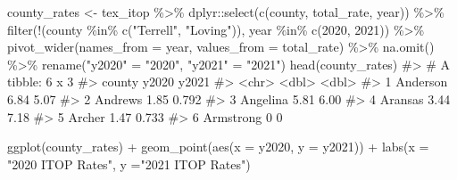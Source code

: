 \documentclass[
  letterpaper,
]{latex/krantz}
\makeatletter
\newenvironment{Shaded}{\begin{snugshade}}{\end{snugshade}}
\newcommand{\AttributeTok}[1]{\textcolor[rgb]{0.40,0.45,0.13}{#1}}
\newcommand{\CommentTok}[1]{\textcolor[rgb]{0.37,0.37,0.37}{#1}}
\newcommand{\DecValTok}[1]{\textcolor[rgb]{0.68,0.00,0.00}{#1}}
\newcommand{\FunctionTok}[1]{\textcolor[rgb]{0.28,0.35,0.67}{#1}}
\newcommand{\NormalTok}[1]{\textcolor[rgb]{0.00,0.23,0.31}{#1}}
\newcommand{\OtherTok}[1]{\textcolor[rgb]{0.00,0.23,0.31}{#1}}
\newcommand{\SpecialCharTok}[1]{\textcolor[rgb]{0.37,0.37,0.37}{#1}}
\newcommand{\StringTok}[1]{\textcolor[rgb]{0.13,0.47,0.30}{#1}}
\newenvironment{kframe}{%
\medskip{}
\setlength{\fboxsep}{.8em}
 \def\at@end@of@kframe{}%
 \ifinner\ifhmode%
  \def\at@end@of@kframe{\end{minipage}}%
  \begin{minipage}{\columnwidth}%
 \fi\fi%
 \def\FrameCommand##1{\hskip\@totalleftmargin \hskip-\fboxsep
 \colorbox{shadecolor}{##1}\hskip-\fboxsep
     \hskip-\linewidth \hskip-\@totalleftmargin \hskip\columnwidth}%
 \MakeFramed {\advance\hsize-\width
   \@totalleftmargin\z@ \linewidth\hsize
   \@setminipage}}%
 {\par\unskip\endMakeFramed%
 \at@end@of@kframe}
\renewenvironment{Shaded}{\begin{kframe}}{\end{kframe}}
\makeatother
\begin{document}
\begin{Shaded}
\begin{Highlighting}[]
\NormalTok{county\_rates }\OtherTok{\textless{}{-}}\NormalTok{ tex\_itop }\SpecialCharTok{\%\textgreater{}\%}
\NormalTok{  dplyr}\SpecialCharTok{::}\FunctionTok{select}\NormalTok{(}\FunctionTok{c}\NormalTok{(county, total\_rate, year)) }\SpecialCharTok{\%\textgreater{}\%}
  \FunctionTok{filter}\NormalTok{(}\SpecialCharTok{!}\NormalTok{(county }\SpecialCharTok{\%in\%} \FunctionTok{c}\NormalTok{(}\StringTok{"Terrell"}\NormalTok{, }\StringTok{"Loving"}\NormalTok{)), }
\NormalTok{         year }\SpecialCharTok{\%in\%} \FunctionTok{c}\NormalTok{(}\DecValTok{2020}\NormalTok{, }\DecValTok{2021}\NormalTok{)) }\SpecialCharTok{\%\textgreater{}\%}
  \FunctionTok{pivot\_wider}\NormalTok{(}\AttributeTok{names\_from =}\NormalTok{ year, }\AttributeTok{values\_from =}\NormalTok{ total\_rate) }\SpecialCharTok{\%\textgreater{}\%}
  \FunctionTok{na.omit}\NormalTok{() }\SpecialCharTok{\%\textgreater{}\%}
  \FunctionTok{rename}\NormalTok{(}\StringTok{"y2020"} \OtherTok{=} \StringTok{"2020"}\NormalTok{, }\StringTok{"y2021"} \OtherTok{=} \StringTok{"2021"}\NormalTok{)}
\FunctionTok{head}\NormalTok{(county\_rates)}
\CommentTok{\#\textgreater{} \# A tibble: 6 x 3}
\CommentTok{\#\textgreater{}   county    y2020 y2021}
\CommentTok{\#\textgreater{}   \textless{}chr\textgreater{}     \textless{}dbl\textgreater{} \textless{}dbl\textgreater{}}
\CommentTok{\#\textgreater{} 1 Anderson   6.84 5.07 }
\CommentTok{\#\textgreater{} 2 Andrews    1.85 0.792}
\CommentTok{\#\textgreater{} 3 Angelina   5.81 6.00 }
\CommentTok{\#\textgreater{} 4 Aransas    3.44 7.18 }
\CommentTok{\#\textgreater{} 5 Archer     1.47 0.733}
\CommentTok{\#\textgreater{} 6 Armstrong  0    0}
\end{Highlighting}
\end{Shaded}

\begin{Shaded}
\begin{Highlighting}[]
\FunctionTok{ggplot}\NormalTok{(county\_rates) }\SpecialCharTok{+} 
 \FunctionTok{geom\_point}\NormalTok{(}\FunctionTok{aes}\NormalTok{(}\AttributeTok{x =}\NormalTok{ y2020, }\AttributeTok{y =}\NormalTok{ y2021)) }\SpecialCharTok{+}
 \FunctionTok{labs}\NormalTok{(}\AttributeTok{x =} \StringTok{"2020 ITOP Rates"}\NormalTok{, }\AttributeTok{y =}\StringTok{"2021 ITOP Rates"}\NormalTok{)}
\end{Highlighting}
\end{Shaded}
\end{document}
